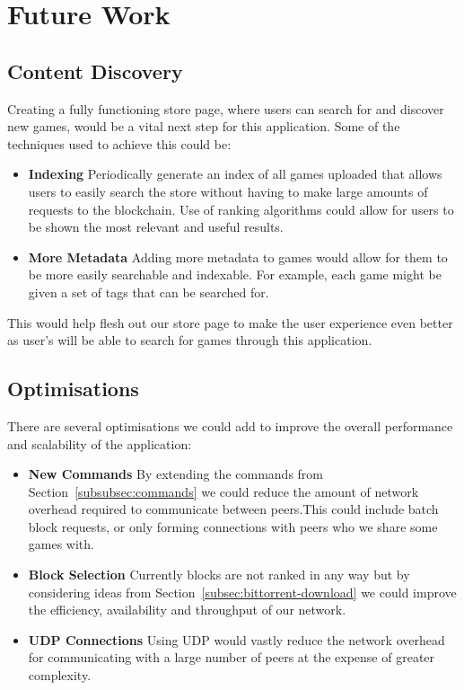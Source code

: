 \section{Future Work}

\subsection*{Content Discovery}
Creating a fully functioning store page, where users can search for and discover new games, would be a vital next step for this application. Some of the techniques used to achieve this could be:

\begin{itemize}
  \item \textbf{Indexing} Periodically generate an index of all games uploaded that allows users to easily search the store without having to make large amounts of requests to the blockchain. Use of ranking algorithms could allow for users to be shown the most relevant and useful results.
  \item \textbf{More Metadata} Adding more metadata to games would allow for them to be more easily searchable and indexable. For example, each game might be given a set of tags that can be searched for.
\end{itemize}

\vspace{2mm}\noindent
This would help flesh out our store page to make the user experience even better as user's will be able to search for games through this application.

\subsection*{Optimisations}

There are several optimisations we could add to improve the overall performance and scalability of the application:

\begin{itemize}
  \item \textbf{New Commands} By extending the commands from Section~\ref{subsubsec:commands} we could reduce the amount of network overhead required to communicate between peers.\newline This could include batch block requests, or only forming connections with peers who we share some games with.
  \item \textbf{Block Selection} Currently blocks are not ranked in any way but by considering ideas from Section~\ref{subsec:bittorrent-download} we could improve the efficiency, availability and throughput of our network.
  \item \textbf{UDP Connections} Using UDP would vastly reduce the network overhead for communicating with a large number of peers at the expense of greater complexity.
\end{itemize}

